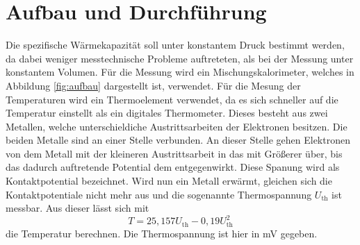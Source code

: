 \section{Aufbau und Durchführung}
\label{sec:durchfuehrung}
Die spezifische Wärmekapazität soll unter konstantem Druck bestimmt werden, da dabei weniger messtechnische Probleme auftreteten, als bei der Messung unter konstantem Volumen.
Für die Messung wird ein Mischungskalorimeter, welches in Abbildung \ref{fig:aufbau} dargestellt ist, verwendet.
Für die Mesung der Temperaturen wird ein Thermoelement verwendet, da es sich schneller auf die Temperatur einstellt als ein digitales Thermometer. Dieses besteht aus zwei Metallen, welche unterschieldiche Austrittsarbeiten der Elektronen besitzen. Die beiden Metalle sind an einer Stelle verbunden. An dieser Stelle gehen Elektronen von dem Metall mit der kleineren Austrittsarbeit in das mit Größerer über, bis das dadurch auftretende Potential dem entgegenwirkt. Diese Spanung wird als Kontaktpotential bezeichnet. Wird nun ein Metall erwärmt, gleichen sich die Kontaktpotentiale nicht mehr aus und die sogenannte Thermospannung $U_\mathrm{th}$ ist messbar.
Aus dieser lässt sich mit
\begin{equation}
  T = 25,157 U_\mathrm{th} - 0,19 U_\mathrm{th}^2
\end{equation}
die Temperatur berechnen. Die Thermospannung ist hier in \si{\milli\volt} gegeben.

